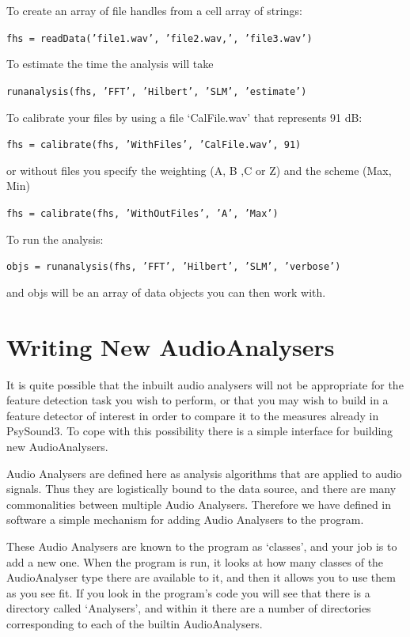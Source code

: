 \documentclass{article}
\begin{document}
To create an array of file handles from a cell array of strings:

\texttt{fhs = readData({'file1.wav', 'file2.wav,', 'file3.wav'})}

To estimate the time the analysis will take 

\texttt{runanalysis(fhs, {'FFT', 'Hilbert', 'SLM'}, 'estimate')}

To calibrate your files by using a file `CalFile.wav' that represents 91 dB:

\texttt{fhs = calibrate(fhs, 'WithFiles', 'CalFile.wav', 91)}

or without files you specify the weighting (A, B ,C or Z) and the scheme (Max, Min)

\texttt{fhs = calibrate(fhs, 'WithOutFiles', 'A', 'Max')}

To run the analysis:

\texttt{objs = runanalysis(fhs, {'FFT', 'Hilbert', 'SLM'}, 'verbose')} 

and objs will be an array of data objects you can then work with.

\clearpage
\section{Writing New AudioAnalysers}

It is quite possible that the inbuilt audio analysers will not be appropriate for the feature detection task you wish to perform, or that you may wish to build in a feature detector of interest in order to compare it to the measures already in PsySound3. To cope with this possibility there is a simple interface for building new AudioAnalysers. 

Audio Analysers are defined here as analysis algorithms that are applied to audio signals. Thus they are logistically bound to the data source, and there are many commonalities between multiple Audio Analysers. Therefore we have defined in software a simple mechanism for adding Audio Analysers to the program. 

These Audio Analysers are known to the program as `classes', and your job is to add a new one. When the program is run, it looks at how many classes of the AudioAnalyser type there are available to it, and then it allows you to use them as you see fit. If you look in the program's code you will see that there is a directory called `Analysers', and within it there are a number of directories corresponding to each of the builtin AudioAnalysers. 
\end{document}
